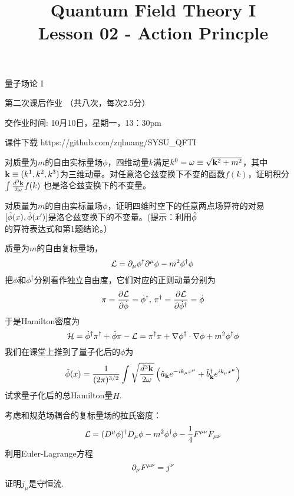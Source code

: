 \documentclass[CJK]{beamer}
\title{Quantum Field Theory I \\ Lesson 02 - Action Princple}
\author{}
\date{}
\begin{document}
\begin{frame}
 
\begin{center}
\begin{Large}
\bch
量子场论 I 

{\vskip 0.3in}

第二次课后作业 （共八次，每次2.5分）

交作业时间: 10月10日，星期一，13：30pm

\ech
\end{Large}
\end{center}

\vskip 0.2in

\bch
课件下载
\ech
https://github.com/zqhuang/SYSU\_QFTI

\end{frame}

\begin{frame}
\bch
对质量为$m$的自由实标量场$\phi$，四维动量$k$满足$k^0 = \omega \equiv \sqrt{{\mathbf{k}}^2+m^2}$，其中${\mathbf{k}}\equiv (k^1, k^2, k^3)$为三维动量。对任意洛仑兹变换下不变的函数$f(k)$，证明积分$\int \frac{d^3{\mathbf{k}}}{2\omega} f(k)$ 也是洛仑兹变换下的不变量。
\ech
\end{frame}

\begin{frame}
\bch
对质量为$m$的自由实标量场$\phi$，证明四维时空下的任意两点场算符的对易$[{\hat{\phi}}(x),{\hat{\phi}}(x')]$是洛仑兹变换下的不变量。(提示：利用${\hat{\phi}}$的算符表达式和第1题结论。）
\ech
\end{frame}

\begin{frame}
\bch
质量为$m$的自由复标量场，
$${\mathcal{L}} = \partial_\mu\phi^\dagger \partial^\mu \phi - m^2\phi^\dagger\phi\, $$
把$\phi$和$\phi^\dagger$分别看作独立自由度，它们对应的正则动量分别为
$$\pi = \frac{\partial {\mathcal{L}}}{\partial \dot\phi} = \dot\phi^\dagger, \,\pi^\dagger = \frac{\partial {\mathcal{L}}}{\partial \dot\phi^\dagger} = \dot\phi $$
于是Hamilton密度为
$${\mathcal{H}} = \dot\phi^\dagger \pi^\dagger +\dot\phi \pi - {\mathcal{L}} = \pi^\dagger \pi + \nabla\phi^\dagger \cdot\nabla\phi + m^2\phi^\dagger \phi $$
我们在课堂上推到了量子化后的$\phi$为
$${\hat{\phi}}(x) = \frac{1}{(2\pi)^{3/2}} \int \sqrt{\frac{d^3{\mathbf{k}}}{2\omega}} \left({\hat{a}}_{{\mathbf{k}}} e^{-ik_\mu x^\mu} + {\hat{b}^\dagger}_{{\mathbf{k}}}e^{ik_\mu x^\mu}\right) $$
试求量子化后的总Hamilton量$\hat{H}$.
\ech
\end{frame}


\begin{frame}
\bch
考虑和规范场耦合的复标量场的拉氏密度：
$${\mathcal{L}} = (D^\mu\phi)^\dagger D_\mu \phi - m^2\phi^\dagger \phi  - \frac{1}{4}{F^{\mu\nu}}{F_{\mu\nu}}$$
利用Euler-Lagrange方程
$$\partial_\mu {F^{\mu\nu}} = j^\nu$$
证明$j_\mu$是守恒流.
\ech
\end{frame}
\end{document}
